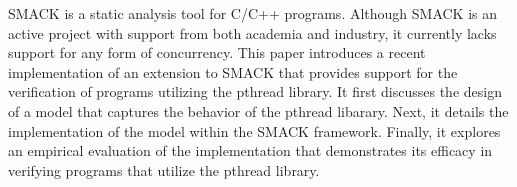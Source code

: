 SMACK is a static analysis tool for C/C++ programs.  Although SMACK is
an active project with support from both academia and industry, it
currently lacks support for any form of concurrency.  This paper
introduces a recent implementation of an extension to SMACK that
provides support for the verification of programs utilizing the
pthread library.  It first discusses the design of a model that
captures the behavior of the pthread libarary.  Next, it details the
implementation of the model within the SMACK framework.  Finally, it
explores an empirical evaluation of the implementation that
demonstrates its efficacy in verifying programs that utilize the
pthread library. 

